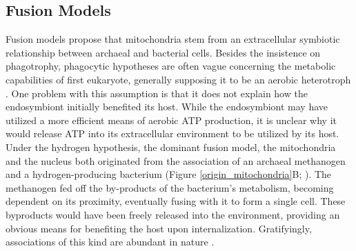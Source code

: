 \documentclass[12pt,twoside]{reedthesis}
\begin{document}
\subsection{Fusion Models}
Fusion models propose that mitochondria stem from an extracellular symbiotic relationship between archaeal and bacterial cells.
Besides the insistence on phagotrophy, phagocytic hypotheses are often vague concerning the metabolic capabilities of first eukaryote, generally supposing it to be an aerobic heterotroph \citep{margulis_origin_1970, cavalier-smith_phagotrophic_2002}.
One problem with this assumption is that it does not explain how the endosymbiont initially benefited its host.
While the endosymbiont may have utilized a more efficient means of aerobic ATP production, it is unclear why it would release ATP into its extracellular environment to be utilized by its host.
Under the hydrogen hypothesis, the dominant fusion model, the mitochondria and the nucleus both originated from the association of an archaeal methanogen and a hydrogen-producing bacterium (Figure \ref{origin_mitochondria}B; \citealp{martin_hydrogen_1998}).
The methanogen fed off the by-products of the bacterium's metabolism, becoming dependent on its proximity, eventually fusing with it to form a single cell.
These byproducts would have been freely released into the environment, providing an obvious means for benefiting the host upon internalization.
Gratifyingly, associations of this kind are abundant in nature \citep{bryant_methanobacillus_1967, broers_psalteriomonas_1990, finlay_new_1993}.
\end{document}
